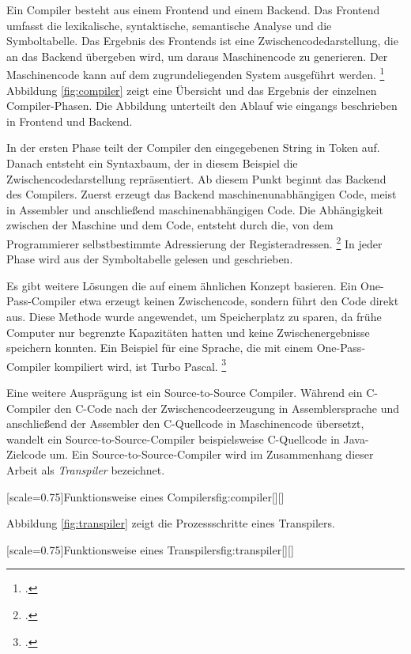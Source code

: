 Ein Compiler besteht aus einem Frontend und einem Backend. Das Frontend umfasst die lexikalische, syntaktische, semantische Analyse und die Symboltabelle.
Das Ergebnis des Frontends ist eine Zwischencodedarstellung, die an das Backend übergeben wird, um daraus Maschinencode zu generieren. Der Maschinencode kann auf dem zugrundeliegenden System ausgeführt werden. \footcite[Vgl. ][S.106ff. ]{aho}
Abbildung \ref{fig:compiler} zeigt eine Übersicht und das Ergebnis der einzelnen Compiler-Phasen. Die Abbildung unterteilt den Ablauf wie eingangs beschrieben in Frontend und Backend.

In der ersten Phase teilt der Compiler den eingegebenen String in Token auf. Danach entsteht ein Syntaxbaum, der in diesem Beispiel die Zwischencodedarstellung repräsentiert. Ab diesem Punkt beginnt das Backend des Compilers. Zuerst erzeugt das Backend maschinenunabhängigen Code, meist in Assembler und anschließend maschinenabhängigen Code. Die Abhängigkeit zwischen der Maschine und dem Code, entsteht durch die, von dem Programmierer selbstbestimmte Adressierung der Registeradressen.  \footcite[Vgl. ][S.30ff. ]{aho}
In jeder Phase wird aus der Symboltabelle gelesen und geschrieben.

Es gibt weitere Lösungen die auf einem ähnlichen Konzept basieren.
Ein One-Pass-Compiler etwa erzeugt keinen Zwischencode, sondern führt den Code direkt aus. Diese Methode wurde angewendet, um Speicherplatz zu sparen, da frühe Computer nur begrenzte Kapazitäten hatten und keine Zwischenergebnisse speichern konnten. Ein Beispiel für eine Sprache, die mit einem One-Pass-Compiler kompiliert wird, ist Turbo Pascal. \footcite[Vgl. ][]{onepass}

Eine weitere Ausprägung ist ein Source-to-Source Compiler.
Während ein C-Compiler den C-Code nach der Zwischencodeerzeugung in Assemblersprache und anschließend der Assembler den C-Quellcode in Maschinencode übersetzt, wandelt ein Source-to-Source-Compiler beispielsweise C-Quellcode in Java-Zielcode um. 
Ein Source-to-Source-Compiler wird im Zusammenhang dieser Arbeit als \emph{Transpiler} bezeichnet.


[scale=0.75]{Funktionsweise eines Compilers}{fig:compiler}[][]
\pagebreak

Abbildung \ref{fig:transpiler} zeigt die Prozessschritte eines Transpilers.

[scale=0.75]{Funktionsweise eines Transpilers}{fig:transpiler}[][]
\pagebreak

